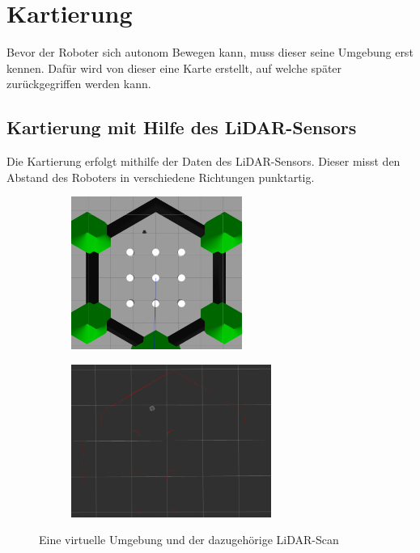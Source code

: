\section{Kartierung}
{
	Bevor der Roboter sich autonom Bewegen kann, muss dieser seine Umgebung erst kennen. Dafür wird von dieser eine Karte erstellt, auf welche später zurückgegriffen werden kann.
	\subsection{Kartierung mit Hilfe des LiDAR-Sensors}
	{
		Die Kartierung erfolgt mithilfe der Daten des LiDAR-Sensors. Dieser misst den Abstand des Roboters in verschiedene Richtungen punktartig. \newline  
		
		\begin{figure}[H]
			\captionsetup{width=.8\linewidth}
			\centering
			\begin{subfigure}[h]{.33\linewidth}
				\centering
				\includegraphics[scale=0.6, height =5cm]{Bilder/virtualmap_world_gazebo.png}
				\label{pic:virtworldgazebo}
			\end{subfigure}%
			\qquad %
			\begin{subfigure}[h]{.33\linewidth}
				\centering
				\includegraphics[scale=0.6, height =5cm]{Bilder/virtualmap_world_rviz.png}
				\label{pic:virtworldlaserrviz}
			\end{subfigure}
			\caption{Eine virtuelle Umgebung und der dazugehörige LiDAR-Scan}
			\label{pic:virtualworld}
		\end{figure}
	
}}

